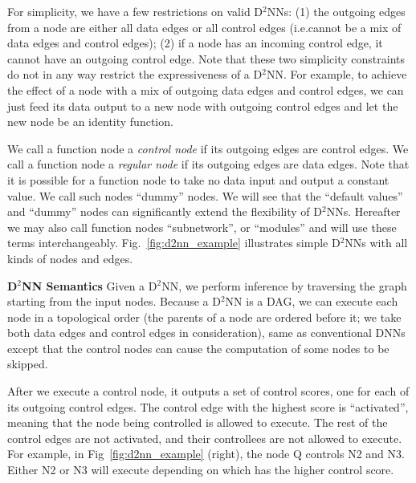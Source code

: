 \documentclass[10pt,twocolumn,letterpaper]{article}
\newcommand{\smallparagraph}[1]{\smallskip \noindent \textbf{#1}}
\begin{document}
For simplicity, we have a few restrictions on valid D$^2$NNs: (1) the outgoing edges from a node are either all data
edges or all control edges (i.e.\@ cannot be a mix of data edges and control edges); (2) if a
node has an incoming control edge, it cannot have an outgoing control edge. Note that
these two simplicity constraints do not in any way restrict the
expressiveness of a D$^2$NN. For example, to achieve the effect of a node with
a mix of outgoing data edges and control edges, we can just feed its data output 
to a new node with outgoing control edges and let the new node be an identity
function. 

We call a function node a \emph{control node} if its outgoing edges are
control edges. We call a function node a \emph{regular node} if its outgoing
edges are data edges. Note that it is possible for a function node to take no data input and output
a constant value. We call such nodes ``dummy'' nodes. We will see that the ``default values'' and ``dummy'' nodes can significantly extend the flexibility of D$^2$NNs.
Hereafter we may
also call  function nodes  ``subnetwork'', or ``modules'' and will use these terms
interchangeably. 
Fig.~\ref{fig:d2nn_example} illustrates simple D$^2$NNs with all kinds of nodes and edges.

\smallparagraph{D$^2$NN Semantics} 
Given a D$^2$NN, we perform inference by traversing the graph
starting from the input nodes. Because a D$^2$NN is a DAG, we can execute each node in a
topological order (the parents of a node are ordered before it; we take both data edges and control edges in consideration), same as
conventional DNNs except that the control nodes can cause the computation
of some nodes to be skipped. 

After we execute a control node, it outputs a set of control scores, one for each of its
outgoing control edges. The control edge with the highest score is ``activated'', meaning that the
node being controlled is allowed to execute. The rest of the control edges are not activated,
and their controllees are not allowed to execute. For example, in
Fig~\ref{fig:d2nn_example} (right), the node Q controls N2 and N3. Either N2 or N3 will execute
depending on which has the higher control score.  
\end{document}
